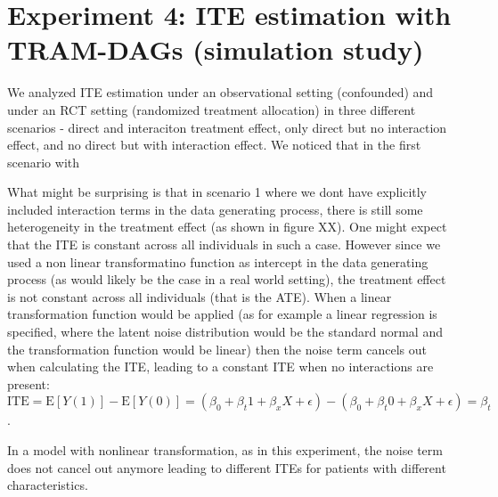 

\section{Experiment 4: ITE estimation with TRAM-DAGs (simulation study)}

We analyzed ITE estimation under an observational setting (confounded) and under an RCT setting (randomized treatment allocation) in three different scenarios - direct and interaciton treatment effect, only direct but no interaction effect, and no direct but with interaction effect. We noticed that in the first scenario with 


What might be surprising is that in scenario 1 where we dont have explicitly included interaction terms in the data generating process, there is still some heterogeneity in the treatment effect (as shown in figure XX). One might expect that the ITE is constant across all individuals in such a case. However since we used a non linear transformatino function as intercept in the data generating process (as would likely be the case in a real world setting), the treatment effect is not constant across all individuals (that is the ATE). When a linear transformation function would be applied (as for example a linear regression is specified, where the latent noise distribution would be the standard normal and the transformation function would be linear) then the noise term cancels out when calculating the ITE, leading to a constant ITE when no interactions are present: $\text{ITE} = \text{E}[Y(1)] -\text{E}[Y(0)] = (\beta_0 + \beta_t 1 + \beta_x X + \epsilon) - (\beta_0 + \beta_t 0 + \beta_x X + \epsilon) = \beta_t$.

In a model with nonlinear transformation, as in this experiment, the noise term does not cancel out anymore leading to different ITEs for patients with different characteristics.

